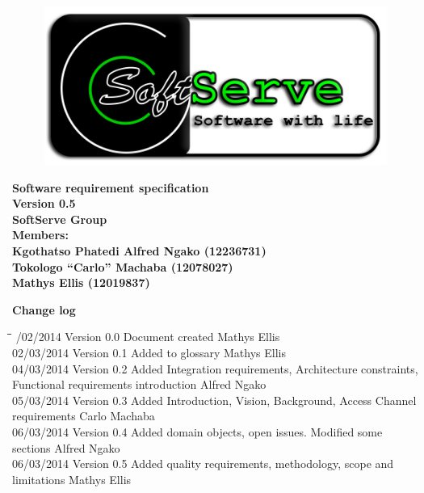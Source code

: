 \documentclass[12pt]{article}
\newcommand{\Title}{Software requirement specification} %
\begin{document}
	\vspace{4em}
	
	\begin{center}%
	
		\begin{figure}[ht!]
			\centering
			\includegraphics{./Pictures/logo.png}
	 	\end{figure}
		\LARGE \bf \Title \\
		{\bf Version 0.5}\\[4em]
	  	\LARGE {\bf SoftServe Group }\\[1em]
	  	\LARGE {\bf Members:}\\[2em]
	  	\large
	     Kgothatso Phatedi Alfred Ngako	(12236731) \\[1em]
	     Tokologo “Carlo” Machaba			(12078027) \\[1em]
	     Mathys Ellis						(12019837) \\[8em]
	    
	\end{center}%
	
	\newpage
		{\LARGE \bf Change log}\\[2em]
		
		\begin{tabbing}
			\hspace*{2.5cm}\=\hspace*{2.5cm}\=\hspace*{8cm}\=\hspace*{3cm} /02/2014 \> Version 0.0 \> Document created \> Mathys Ellis \\
			02/03/2014 \> Version 0.1 \> Added to glossary \> Mathys Ellis \\
			04/03/2014 \> Version 0.2 \> Added Integration requirements, Architecture constraints, Functional requirements introduction   \> Alfred Ngako \\
			05/03/2014 \> Version 0.3 \> Added Introduction, Vision, Background, Access Channel requirements \> Carlo Machaba \\
			06/03/2014 \> Version 0.4 \> Added domain objects, open issues. Modified some sections  \> Alfred Ngako \\
			06/03/2014 \> Version 0.5 \> Added quality requirements, methodology, scope and limitations  \> Mathys Ellis \\
			
		\end{tabbing}
	
\end{document}

